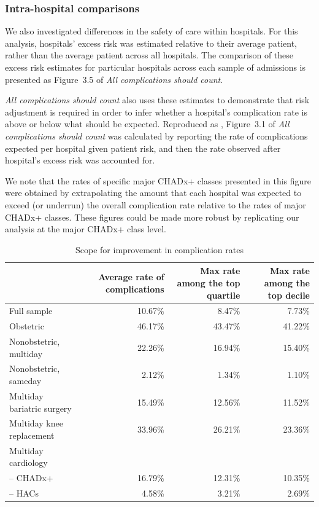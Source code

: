 \documentclass[submission]{grattan}
\newcommand*{\Figure}[1]{Figure~#1}
\newcommand*{\myTitle}{All complications should count}
\begin{document}
\subsubsection{Intra-hospital comparisons}\label{subsec:intra-hospital-comparisons}

We also investigated differences in the safety of care within hospitals.
For this analysis, hospitals' excess risk was estimated relative to their average patient, rather than the average patient across all hospitals.
The comparison of these excess risk estimates for particular hospitals across each sample of admissions is presented as \Figure{3.5} of \textit{\myTitle}.

\textit{\myTitle} also uses these estimates to demonstrate that risk adjustment is required in order to infer whether a hospital's complication rate is above or below what should be expected.
Reproduced as , \Figure{3.1} of \textit{\myTitle} was calculated by reporting the rate of complications expected per hospital given patient risk, and then the rate observed after hospital's excess risk was accounted for.

We note that the rates of specific major CHADx+ classes presented in this figure were obtained by extrapolating the amount that each hospital was expected to exceed (or underrun) the overall complication rate relative to the rates of major CHADx+ classes.
These figures could be made more robust by replicating our analysis at the major CHADx+ class level.

\begin{table}
\caption{Scope for improvement in complication rates}\label{tbl:scope-for-improvement-in-complication-rates}
\begin{tabularx}{\linewidth}{lRRR}
\toprule
& \textbf{Average rate of complications} & \textbf{Max rate among the top quartile} & \textbf{Max rate among the top decile}\tabularnewline
\midrule
Full sample & 10.67\% & 8.47\% & 7.73\%\tabularnewline
Obstetric & 46.17\% & 43.47\% & 41.22\%\tabularnewline
Nonobstetric, multiday & 22.26\% & 16.94\% & 15.40\%\tabularnewline
Nonobstetric, sameday & 2.12\% & 1.34\% & 1.10\%\tabularnewline
Multiday bariatric surgery & 15.49\% & 12.56\% & 11.52\%\tabularnewline
Multiday knee replacement &  33.96\% & 26.21\% & 23.36\%\tabularnewline
Multiday cardiology & & \tabularnewline
-- CHADx+ & 16.79\% & 12.31\% & 10.35\%\tabularnewline
-- HACs & 4.58\% & 3.21\% & 2.69\%\tabularnewline
\bottomrule
\end{tabularx}
\vspace{2.25\baselineskip}
\end{table}
\end{document}
